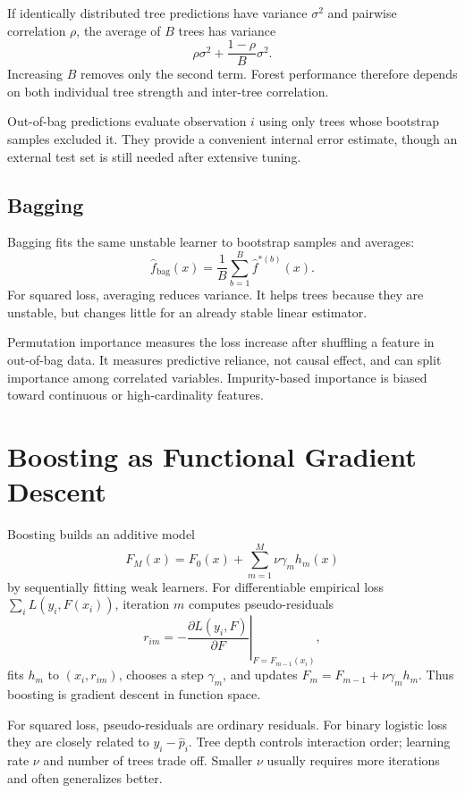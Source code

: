 \documentclass[12pt,oneside]{book}
\numberwithin{equation}{section}
\theoremstyle{definition}
\theoremstyle{plain}
\theoremstyle{remark}
\begin{document}
If identically distributed tree predictions have variance $\sigma^2$ and
pairwise correlation $\rho$, the average of $B$ trees has variance
\[
 \rho\sigma^2+\frac{1-\rho}{B}\sigma^2.
\]
Increasing $B$ removes only the second term. Forest performance therefore
depends on both individual tree strength and inter-tree correlation.

Out-of-bag predictions evaluate observation $i$ using only trees whose
bootstrap samples excluded it. They provide a convenient internal error
estimate, though an external test set is still needed after extensive tuning.

\subsection{Bagging}

Bagging fits the same unstable learner to bootstrap samples and averages:
\[
    \widehat f_{\mathrm{bag}}(x)
    =\frac1B\sum_{b=1}^B\widehat f^{*(b)}(x).
\]
For squared loss, averaging reduces variance. It helps trees because they are
unstable, but changes little for an already stable linear estimator.

Permutation importance measures the loss increase after shuffling a feature
in out-of-bag data. It measures predictive reliance, not causal effect, and
can split importance among correlated variables. Impurity-based importance is
biased toward continuous or high-cardinality features.

\section{Boosting as Functional Gradient Descent}

Boosting builds an additive model
\[
    F_M(x)=F_0(x)+\sum_{m=1}^M\nu\gamma_mh_m(x)
\]
by sequentially fitting weak learners. For differentiable empirical loss
$\sum_iL(y_i,F(x_i))$, iteration $m$ computes pseudo-residuals
\[
    r_{im}=-\left.
       \frac{\partial L(y_i,F)}{\partial F}
       \right|_{F=F_{m-1}(x_i)},
\]
fits $h_m$ to $(x_i,r_{im})$, chooses a step $\gamma_m$, and updates
$F_m=F_{m-1}+\nu\gamma_mh_m$. Thus boosting is gradient descent in function
space.

For squared loss, pseudo-residuals are ordinary residuals. For binary logistic
loss they are closely related to $y_i-\widehat p_i$. Tree depth controls
interaction order; learning rate $\nu$ and number of trees trade off. Smaller
$\nu$ usually requires more iterations and often generalizes better.
\end{document}
